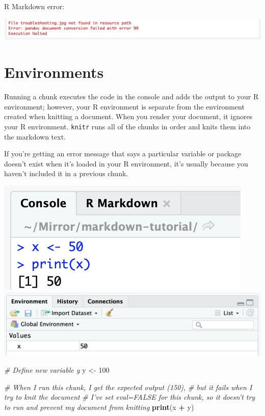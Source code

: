 \documentclass[
  openany]{book}
\newenvironment{Shaded}{\begin{snugshade}}{\end{snugshade}}
\newcommand{\CommentTok}[1]{\textcolor[rgb]{0.56,0.35,0.01}{\textit{#1}}}
\newcommand{\DecValTok}[1]{\textcolor[rgb]{0.00,0.00,0.81}{#1}}
\newcommand{\KeywordTok}[1]{\textcolor[rgb]{0.13,0.29,0.53}{\textbf{#1}}}
\newcommand{\NormalTok}[1]{#1}
\newcommand{\OperatorTok}[1]{\textcolor[rgb]{0.81,0.36,0.00}{\textbf{#1}}}
\newcommand{\StringTok}[1]{\textcolor[rgb]{0.31,0.60,0.02}{#1}}
\begin{document}
R Markdown error:

\includegraphics[width=\textwidth]{images/error_conversion}

\hypertarget{environments}{%
\section{Environments}\label{environments}}

Running a chunk executes the code in the console and adds the output to your R environment; however, your R environment is separate from the environment created when knitting a document. When you render your document, it ignores your R environment. \texttt{knitr} runs all of the chunks in order and knits them into the markdown text.

If you're getting an error message that says a particular variable or package doesn't exist when it's loaded in your R environment, it's usually because you haven't included it in a previous chunk.

\includegraphics[width=\textwidth]{images/environment_console}
\includegraphics[width=\textwidth]{images/environment_var}

\begin{Shaded}
\begin{Highlighting}[]
\CommentTok{# Define new variable y}
\NormalTok{y <-}\StringTok{ }\DecValTok{100}

\CommentTok{# When I run this chunk, I get the expected output (150),}
\CommentTok{# but it fails when I try to knit the document}
\CommentTok{# I've set eval=FALSE for this chunk, so it doesn't try to run and prevent my document from knitting}
\KeywordTok{print}\NormalTok{(x }\OperatorTok{+}\StringTok{ }\NormalTok{y)}
\end{Highlighting}
\end{Shaded}
\end{document}
